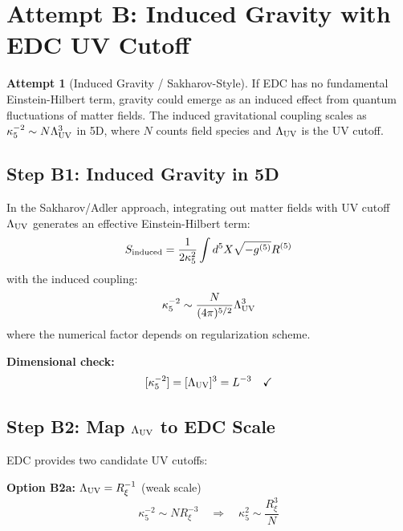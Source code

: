 \documentclass[11pt,a4paper]{article}
\theoremstyle{definition}
\newtheorem{attempt}{Attempt}
\begin{document}
\section{Attempt B: Induced Gravity with EDC UV Cutoff}
\label{sec:attempt_b}

\begin{attempt}[Induced Gravity / Sakharov-Style]
If EDC has no fundamental Einstein-Hilbert term, gravity could emerge as an
induced effect from quantum fluctuations of matter fields. The induced gravitational
coupling scales as $\kappa_5^{-2} \sim N \Lambda_{\rm UV}^3$ in 5D, where $N$ counts
field species and $\Lambda_{\rm UV}$ is the UV cutoff.
\end{attempt}

\subsection{Step B1: Induced Gravity in 5D}

In the Sakharov/Adler approach, integrating out matter fields with UV cutoff
$\Lambda_{\rm UV}$ generates an effective Einstein-Hilbert term:
\begin{equation}
S_{\rm induced} = \frac{1}{2\kappa_5^2} \int d^5X \sqrt{-g^{(5)}} R^{(5)}
\end{equation}
with the induced coupling:
\begin{equation}
\kappa_5^{-2} \sim \frac{N}{(4\pi)^{5/2}} \Lambda_{\rm UV}^3
\label{eq:induced_5D}
\end{equation}
where the numerical factor depends on regularization scheme.

\textbf{Dimensional check:}
\[
[\kappa_5^{-2}] = [\Lambda_{\rm UV}]^3 = L^{-3} \quad \checkmark
\]

\subsection{Step B2: Map $\Lambda_{\rm UV}$ to EDC Scale}

EDC provides two candidate UV cutoffs:

\textbf{Option B2a:} $\Lambda_{\rm UV} = R_\xi^{-1}$ (weak scale)
\begin{equation}
\kappa_5^{-2} \sim N R_\xi^{-3} \quad \Rightarrow \quad \kappa_5^2 \sim \frac{R_\xi^3}{N}
\end{equation}
\end{document}
